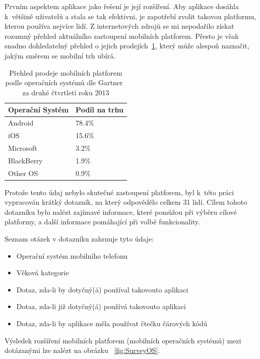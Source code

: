 \documentclass[thesis=B,czech]{FITthesis}[2013/10/20]
\begin{document}
Prvním aspektem aplikace jako řešení je její rozšíření. Aby aplikace dosáhla k~většině uživatelů a stala se tak efektivni, je zapotřebí zvolit takovou platformu, kterou používa nejvíce lidí. Z internetových zdrojů se mi nepodařilo získat rozumný přehled aktuálního zastoupení mobilních platforem. Přesto je však snadno dohledatelný přehled o jejich prodejích~\ref{table:MobilePlatf}, který může alespoň naznačit, jakým směrem se mobilní trh ubírá.

\begin{table}[H]
    \begin{tabular}{|l|l|}
    \hline
    Operační Systém & Podíl na trhu \\ \hline
    Android         & 78.4\%        \\ \hline
    iOS             & 15.6\%        \\ \hline
    Microsoft       & 3.2\%         \\ \hline
    BlackBerry      & 1.9\%         \\ \hline
    Other OS        & 0.9\%         \\ \hline
    \end{tabular}
    \caption{Přehled prodeje mobilních platforem podle operačních systémů dle Gartner~\cite{gartner} za druhé čtvrtletí roku 2013}
    \label{table:MobilePlatf}
\end{table}

Protože tento údaj nebylo skutečné zastoupení platforem, byl k~této práci vypracován krátký dotazník, na který odpovědělo celkem 31 lidí. Cílem tohoto dotazníku bylo nalézt zajímavé informace, které pomůžou při výběru cílové platformy, a další informace pomáhající při volbě funkcionality.

Seznam otázek v dotazníku zahrnuje tyto údaje:
\begin{itemize}
	\item Operační systém mobilního telefonu
	\item Věková kategorie
	\item Dotaz, zda-li by dotyčný(á) používal takovouto aplikaci
	\item Dotaz, zda-li již dotyčný(á) používá takovouto aplikaci
	\item Dotaz, zda-li by aplikace měla používat čtečku čárových kódů
\end{itemize}

Výsledek rozšíření mobilních platforem (mobilních operačních systémů) mezi dotázanými lze nalézt na obrázku ~\ref{fig:SurveyOS}.
\end{document}
